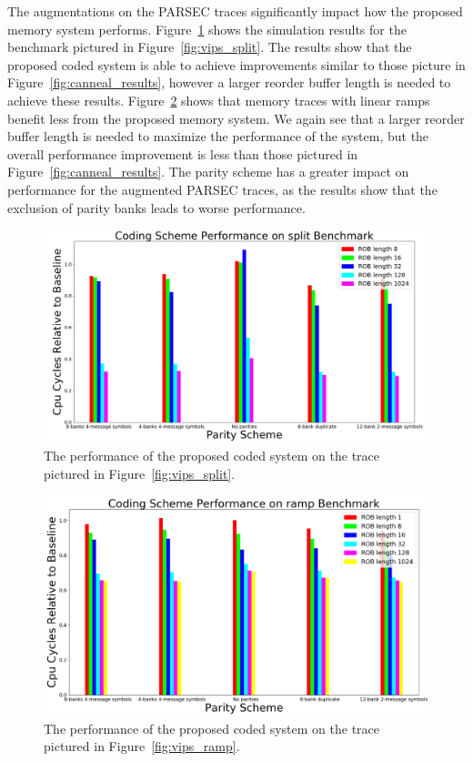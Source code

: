 The augmentations on the PARSEC traces significantly impact how the proposed memory system performs. Figure~\ref{fig:vips_split_results} shows the simulation results for the benchmark pictured in Figure~\ref{fig:vips_split}. The results show that the proposed coded system is able to achieve improvements similar to those picture in Figure~\ref{fig:canneal_results}, however a larger reorder buffer length is needed to achieve these results. Figure~\ref{fig:vips_ramp_results} shows that memory traces with linear ramps benefit less from the proposed memory system. We again see that a larger reorder buffer length is needed to maximize the performance of the system, but the overall performance improvement is less than those pictured in Figure~\ref{fig:canneal_results}. The parity scheme has a greater impact on performance for the augmented PARSEC traces, as the results show that the exclusion of parity banks leads to worse performance. 

\begin{figure}[h!]
		\includegraphics[width=\linewidth]{figures/vips_split_results.png}
		\caption{The performance of the proposed coded system on the trace pictured in Figure~\ref{fig:vips_split}.}
		\label{fig:vips_split_results}
\end{figure}


\begin{figure}[h!]
		\includegraphics[width=\linewidth]{figures/vips_ramp_results.png}
		\caption{The performance of the proposed coded system on the trace pictured in Figure~\ref{fig:vips_ramp}.}
		\label{fig:vips_ramp_results}
\end{figure}